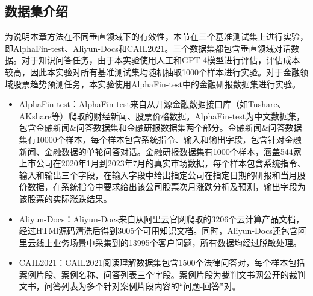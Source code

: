 \subsection{数据集介绍}

为说明本章方法在不同垂直领域下的有效性，本节在三个基准测试集上进行实验，即AlphaFin-test、Aliyun-Docs和CAIL2021\cite{zhong2019jec}。三个数据集都包含垂直领域对话数据。对于知识问答任务，由于本实验使用人工和GPT-4模型进行评估，评估成本较高，因此本实验对所有基准测试集均随机抽取1000个样本进行实验。对于金融领域股票趋势预测任务，本实验使用AlphaFin-test中的金融研报数据集进行实验。


\begin{itemize}[topsep = 0 pt, itemsep= 0 pt, parsep=0pt, partopsep=0pt, leftmargin=36pt, itemindent=0pt, labelsep=6pt, listparindent=24pt]

	\item AlphaFin-test：AlphaFin-test来自从开源金融数据接口库（如Tushare\cite{tushare}、AKshare\cite{akshare}等）爬取的财经新闻、股票价格数据。AlphaFin-test为中文数据集，包含金融新闻\&问答数据集和金融研报数据集两个部分。金融新闻\&问答数据集有10000个样本，每个样本包含系统指令、输入和输出字段，包含针对金融新闻、金融数据的单轮问答对话。金融研报数据集有1000个样本，涵盖544家上市公司在2020年1月到2023年7月的真实市场数据，每个样本包含系统指令、输入和输出三个字段，在输入字段中给出指定公司在指定日期的研报和当月股价数据，在系统指令中要求给出该公司股票次月涨跌分析及预测，输出字段为该股票的实际涨跌结果。
	
	\item Aliyun-Docs：Aliyun-Docs来自从阿里云官网爬取的3206个云计算产品文档，经过HTMl源码清洗后得到3005个可用知识文档。同时，Aliyun-Docs还包含阿里云线上业务场景中采集到的13995个客户问题，所有数据均经过脱敏处理。
	
	\item CAIL2021：CAIL2021阅读理解数据集包含1500个法律问答对，每个样本包括案例片段、案例名称、问答列表三个字段。案例片段为裁判文书网公开的裁判文书，问答列表为多个针对案例片段内容的“问题-回答”对。
\end{itemize}

